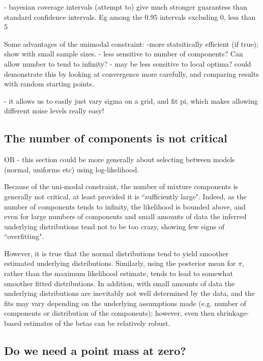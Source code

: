\documentclass[11pt]{article}
\begin{document}
- bayesian coverage intervals (attempt to) give much stronger guarantess than standard confidence intervals. Eg among the 0.95 intervals excluding 0,
less than 5%

Some advantages of the unimodal constraint:
-more statsitically efficient (if true); show with small sample sizes.
- less sensitive to number of components? Can allow number to tend to infinity?
- may be less sensitive to local optima?
could demonstrate this by looking at convergence more carefully, and comparing
results with random starting points.

- it allows us to easily just vary sigma on a grid, and fit pi, which
makes allowing different noise levels really easy!




\subsection{The number of components is not critical}
OR - this section could be more generally about selecting between
models (normal, uniforms etc) using log-likelihood.

Because of the uni-modal constraint, the number of mixture components
is generally not critical, at least provided it is ``sufficiently large". 
Indeed, as the number of components tends to infinity, the likelihood
is bounded above, and even for large numbers of components and small amounts of data the inferred underlying distributions tend not to be too crazy, showing few signs of ``overfitting". 

However, it is true that the normal distributions tend to yield smoother estimated underlying distributions. Similarly, using the posterior mean for $\pi$, rather
than the maximum likelihood estimate, tends to lead to somewhat smoother fitted distributions. In addition, with small amounts of data the underlying
distributions are inevitably not well determined by the data, and the fits may vary depending on the underlying assumptions made (e.g. number of components or distribution of the components); however, even then shrinkage-based estimates
of the betas can be relatively robust.

\subsection{Do we need a point mass at zero?}
\end{document}
